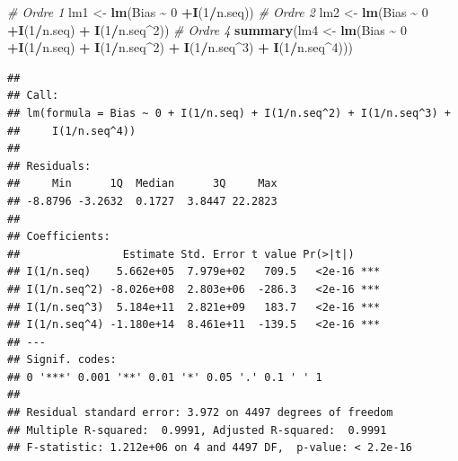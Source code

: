 \documentclass[
  11pt,
  french,
  a4paper,
  extrafontsizes,onecolumn,openright
  ]{memoir}
\newenvironment{Shaded}{\begin{snugshade}}{\end{snugshade}}
\newcommand{\CommentTok}[1]{\textcolor[rgb]{0.56,0.35,0.01}{\textit{#1}}}
\newcommand{\DecValTok}[1]{\textcolor[rgb]{0.00,0.00,0.81}{#1}}
\newcommand{\FunctionTok}[1]{\textcolor[rgb]{0.13,0.29,0.53}{\textbf{#1}}}
\newcommand{\NormalTok}[1]{#1}
\newcommand{\OtherTok}[1]{\textcolor[rgb]{0.56,0.35,0.01}{#1}}
\newcommand{\SpecialCharTok}[1]{\textcolor[rgb]{0.81,0.36,0.00}{\textbf{#1}}}
\begin{document}
\begin{Shaded}
\begin{Highlighting}[]
\CommentTok{\# Ordre 1}
\NormalTok{lm1 }\OtherTok{\textless{}{-}} \FunctionTok{lm}\NormalTok{(Bias }\SpecialCharTok{\textasciitilde{}} \DecValTok{0} \SpecialCharTok{+}\FunctionTok{I}\NormalTok{(}\DecValTok{1}\SpecialCharTok{/}\NormalTok{n.seq))}
\CommentTok{\# Ordre 2}
\NormalTok{lm2 }\OtherTok{\textless{}{-}} \FunctionTok{lm}\NormalTok{(Bias }\SpecialCharTok{\textasciitilde{}} \DecValTok{0} \SpecialCharTok{+}\FunctionTok{I}\NormalTok{(}\DecValTok{1}\SpecialCharTok{/}\NormalTok{n.seq) }\SpecialCharTok{+} \FunctionTok{I}\NormalTok{(}\DecValTok{1}\SpecialCharTok{/}\NormalTok{n.seq}\SpecialCharTok{\^{}}\DecValTok{2}\NormalTok{))}
\CommentTok{\# Ordre 4}
\FunctionTok{summary}\NormalTok{(lm4 }\OtherTok{\textless{}{-}} \FunctionTok{lm}\NormalTok{(Bias }\SpecialCharTok{\textasciitilde{}} \DecValTok{0} \SpecialCharTok{+}\FunctionTok{I}\NormalTok{(}\DecValTok{1}\SpecialCharTok{/}\NormalTok{n.seq) }\SpecialCharTok{+} \FunctionTok{I}\NormalTok{(}\DecValTok{1}\SpecialCharTok{/}\NormalTok{n.seq}\SpecialCharTok{\^{}}\DecValTok{2}\NormalTok{) }
                  \SpecialCharTok{+} \FunctionTok{I}\NormalTok{(}\DecValTok{1}\SpecialCharTok{/}\NormalTok{n.seq}\SpecialCharTok{\^{}}\DecValTok{3}\NormalTok{) }\SpecialCharTok{+} \FunctionTok{I}\NormalTok{(}\DecValTok{1}\SpecialCharTok{/}\NormalTok{n.seq}\SpecialCharTok{\^{}}\DecValTok{4}\NormalTok{)))}
\end{Highlighting}
\end{Shaded}

\begin{verbatim}
## 
## Call:
## lm(formula = Bias ~ 0 + I(1/n.seq) + I(1/n.seq^2) + I(1/n.seq^3) + 
##     I(1/n.seq^4))
## 
## Residuals:
##     Min      1Q  Median      3Q     Max 
## -8.8796 -3.2632  0.1727  3.8447 22.2823 
## 
## Coefficients:
##                Estimate Std. Error t value Pr(>|t|)    
## I(1/n.seq)    5.662e+05  7.979e+02   709.5   <2e-16 ***
## I(1/n.seq^2) -8.026e+08  2.803e+06  -286.3   <2e-16 ***
## I(1/n.seq^3)  5.184e+11  2.821e+09   183.7   <2e-16 ***
## I(1/n.seq^4) -1.180e+14  8.461e+11  -139.5   <2e-16 ***
## ---
## Signif. codes:  
## 0 '***' 0.001 '**' 0.01 '*' 0.05 '.' 0.1 ' ' 1
## 
## Residual standard error: 3.972 on 4497 degrees of freedom
## Multiple R-squared:  0.9991, Adjusted R-squared:  0.9991 
## F-statistic: 1.212e+06 on 4 and 4497 DF,  p-value: < 2.2e-16
\end{verbatim}

\normalsize
\end{document}
